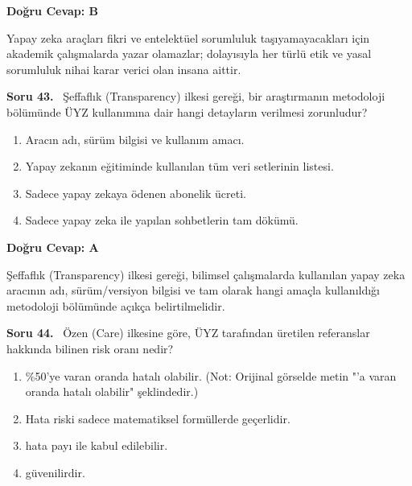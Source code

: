 \documentclass[11pt,a4paper,openany]{book}
\begin{document}
\vspace{4pt}
\begin{tcolorbox}[title=Cevap ve Açıklama, colback=gray!3!white, colframe=primarycolor!90!black, arc=2mm, fonttitle=\bfseries\sffamily, top=6pt, bottom=6pt]
    \textbf{Doğru Cevap: B}

    \vspace{2pt}
    Yapay zeka araçları fikri ve entelektüel sorumluluk taşıyamayacakları için akademik çalışmalarda yazar olamazlar; dolayısıyla her türlü etik ve yasal sorumluluk nihai karar verici olan insana aittir.
\end{tcolorbox}
\vspace{10pt}
\needspace{5cm}
\vspace{8pt}
\noindent\textbf{\large\sffamily Soru 43.} \ Şeffaflık (Transparency) ilkesi gereği, bir araştırmanın metodoloji bölümünde ÜYZ kullanımına dair hangi detayların verilmesi zorunludur?

\begin{enumerate}[label=\Alph*), leftmargin=25pt, topsep=4pt, itemsep=2pt]
        \item Aracın adı, sürüm bilgisi ve kullanım amacı.
        \item Yapay zekanın eğitiminde kullanılan tüm veri setlerinin listesi.
        \item Sadece yapay zekaya ödenen abonelik ücreti.
        \item Sadece yapay zeka ile yapılan sohbetlerin tam dökümü.
\end{enumerate}

\vspace{4pt}
\begin{tcolorbox}[title=Cevap ve Açıklama, colback=gray!3!white, colframe=primarycolor!90!black, arc=2mm, fonttitle=\bfseries\sffamily, top=6pt, bottom=6pt]
    \textbf{Doğru Cevap: A}

    \vspace{2pt}
    Şeffaflık (Transparency) ilkesi gereği, bilimsel çalışmalarda kullanılan yapay zeka aracının adı, sürüm/versiyon bilgisi ve tam olarak hangi amaçla kullanıldığı metodoloji bölümünde açıkça belirtilmelidir.
\end{tcolorbox}
\vspace{10pt}
\needspace{5cm}
\vspace{8pt}
\noindent\textbf{\large\sffamily Soru 44.} \ Özen (Care) ilkesine göre, ÜYZ tarafından üretilen referanslar hakkında bilinen risk oranı nedir?

\begin{enumerate}[label=\Alph*), leftmargin=25pt, topsep=4pt, itemsep=2pt]
        \item \%50'ye varan oranda hatalı olabilir. (Not: Orijinal görselde metin "'a varan oranda hatalı olabilir" şeklindedir.)
        \item Hata riski sadece matematiksel formüllerde geçerlidir.
        \item hata payı ile kabul edilebilir.
        \item güvenilirdir.
\end{enumerate}
\end{document}
